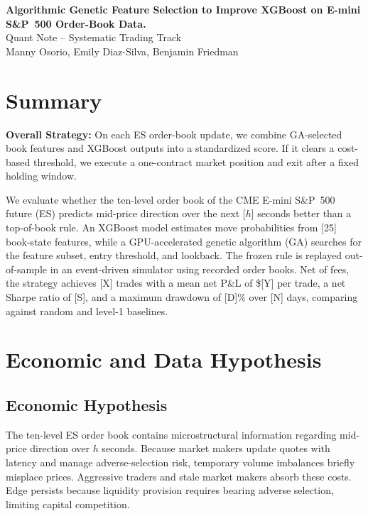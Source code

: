 \documentclass[11pt,letterpaper]{article}
\newcommand{\NoteTitle}{Algorithmic Genetic Feature Selection to Improve XGBoost on E-mini S\&P~500 Order-Book Data.}
\newcommand{\Authors}{Manny Osorio, Emily Diaz-Silva, Benjamin Friedman}
\begin{document}
 
\begin{center}
    {\LARGE\bfseries\color{gatorblue} \NoteTitle}\\[6pt]
    {\large Quant Note -- Systematic Trading Track}\\[4pt]
    \Authors
\end{center}
 
\section{Summary}
\textbf{Overall Strategy:} On each ES order-book update, we combine GA-selected book features and XGBoost outputs into a standardized score. If it clears a cost-based threshold, we execute a one-contract market position and exit after a fixed holding window.
 
We evaluate whether the ten-level order book of the CME E-mini S\&P~500 future (ES) predicts mid-price direction over the next [$h$] seconds better than a top-of-book rule. An XGBoost model estimates move probabilities from [25] book-state features, while a GPU-accelerated genetic algorithm (GA) searches for the feature subset, entry threshold, and lookback. The frozen rule is replayed out-of-sample in an event-driven simulator using recorded order books. Net of fees, the strategy achieves [X] trades with a mean net P\&L of \$[Y] per trade, a net Sharpe ratio of [S], and a maximum drawdown of [D]\% over [N] days, comparing against random and level-1 baselines.
 
\section{Economic and Data Hypothesis}
 
\subsection{Economic Hypothesis}
The ten-level ES order book contains microstructural information regarding mid-price direction over $h$ seconds. Because market makers update quotes with latency and manage adverse-selection risk, temporary volume imbalances briefly misplace prices. Aggressive traders and stale market makers absorb these costs. Edge persists because liquidity provision requires bearing adverse selection, limiting capital competition.
 
\end{document}
